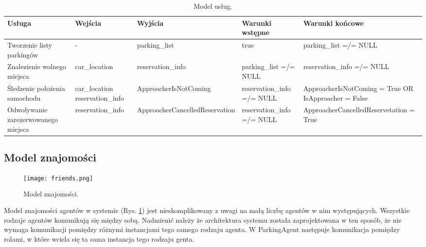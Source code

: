 \begin{table}[!h] \label{tab:modeluslug} \centering
    \caption{Model usług.}
    \begin{tabular} {| m{2cm} | m{2cm} | m{3cm} | m{3cm} | m{4cm} |} \hline
        Usługa   & Wejścia & Wyjścia & Warunki wstępne & Warunki końcowe \\ \hline
        Tworzenie listy parkingów & - & parking\_list & true & parking\_list =/= NULL \\ \hline
        Znalezienie wolnego miejsca & car\_location & reservation\_info & parking\_list =/= NULL & reservation\_info =/= NULL \\ \hline
        Śledzenie położenia samochodu & car\_location reservation\_info & ApproacherIsNot\-Coming & reservation\_info =/= NULL & ApproacherIsNot\-Coming = True OR IsApproacher = False \\ \hline
        Odwoływanie zarezerwowanego miejsca & reserva\-tion\_info & Approacher\-Cancelled\-Reservation & reservation\_info =/= NULL & ApproacherCancelled\-Reservetation = True \\ \hline
    \end{tabular}
\end{table}



\newpage
\subsection{Model znajomości}

\begin{figure}[h!]
    \centering \texttt{[image: friends.png]}
    \caption{Model znajomości.}
    \label{fig:friends}
\end{figure}

Model znajomości agentów w systemie (Rys. \ref{fig:friends}) jest nieskomplikowany z uwagi na małą liczbę agentów w nim występujących. Wszystkie rodzaje agentów komunikują się między sobą. Nadmienić należy że architektura systemu została zaprojektowana w ten sposób, że nie wymaga komunikacji pomiędzy różnymi instancjami tego samego rodzaju agenta. W ParkingAgent następuje komunikacja pomiędzy rolami, w które wciela się ta sama instancja tego rodzaju genta.